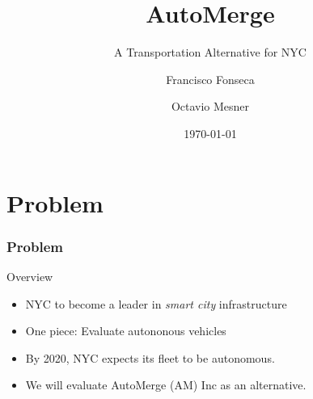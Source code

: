 \documentclass{beamer}
\title{AutoMerge}
\subtitle{A Transportation Alternative for NYC}
\date{\today}
\author[Fonseca Mesner]{Francisco Fonseca \and Octavio Mesner}
\institute{Carnegie Mellon University}
\begin{document}
\maketitle


\section{Problem}

\begin{frame}
  \frametitle{Problem}
  \begin{block}{Overview}
  \begin{itemize}
  \item NYC to become a leader in \emph{smart city} infrastructure
  \item One piece: Evaluate autononous vehicles
  \item By 2020, NYC expects its fleet to be autonomous.
  \item We will evaluate AutoMerge (AM) Inc as an alternative.
  \end{itemize}
  \end{block}
\end{frame}
\end{document}
